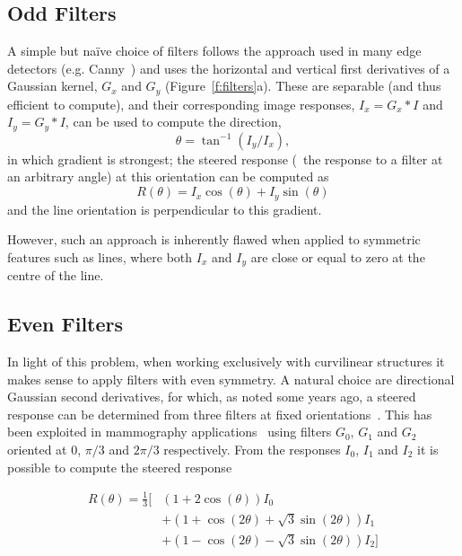 \documentclass[10pt,twocolumn,letterpaper]{article}
\newcommand{\fref}[1]{Figure~\ref{#1}}
\def\Gx{G_x}
\def\Gy{G_y}
\def\Ix{I_x}
\def\Iy{I_y}
\newcommand{\comment}[1]{}
\begin{document}
\subsection{Odd Filters}
\label{s:odd_filters}
A simple but na\"ive choice of filters follows the approach used in many edge detectors (e.g. Canny~\cite{Canny_PAMI86}) and uses the horizontal and vertical first derivatives of a Gaussian kernel, $\Gx$ and $\Gy$ (\fref{f:filters}a). These are separable (and thus efficient to compute), and their corresponding image responses, $\Ix=\Gx\ast I$ and $\Iy=\Gy\ast I$, can be used to compute the direction,
%
\begin{equation}
\theta = \tan^{-1}(\Iy/\Ix),
\label{e:1d}
\end{equation}
%
\noindent in which gradient is strongest; the steered response (\ie~the response to a filter at an arbitrary angle) at this orientation can be computed as
%
\begin{equation}
R(\theta) = \Ix \cos(\theta) + \Iy \sin(\theta)
\label{e:r1}
\end{equation}
%
\noindent and the line orientation is perpendicular to this gradient.

However, such an approach is inherently flawed when applied to symmetric features such as lines, where both $\Ix$ and $\Iy$ are close or equal to zero at the centre of the line. \comment{As such the orientation is not defined. Despite this we note that first derivatives are frequently used to estimate the orientation of linear structures [citations? examples?] - or maybe not? can't realy find any applicable examples..}

\subsection{Even Filters}
\label{s:even_filters}
In light of this problem, when working exclusively with curvilinear structures it makes sense to apply filters with even symmetry. A natural choice are directional Gaussian second derivatives, for which, as noted some years ago, a steered response can be determined from three filters at fixed orientations~\cite{Freeman_Adelson_TPAMI91,Koenderink_vanDoorn_TPAMI92}. This has been exploited in mammography applications~\cite{Karssemeijer_teBrake_TMI96} using filters $G_0$, $G_1$ and $G_2$ oriented at 0, $\pi /3$ and $2\pi/3$ respectively. From the responses $I_0$, $I_1$ and $I_2$ it is possible to compute the steered response

\begin{align}
R(\theta) = \frac{1}{3}\Big[ %
    &  \left(1 + 2\cos(\theta) \right)I_0 \nonumber \\
    &+ \left(1 + \cos(2\theta) + \sqrt{3}\sin(2\theta)\right)I_1  \nonumber \\
    &+ \left(1 - \cos(2\theta) - \sqrt{3}\sin(2\theta)\right)I_2 \Big] \label{e:r2} %
\end{align}
\end{document}
